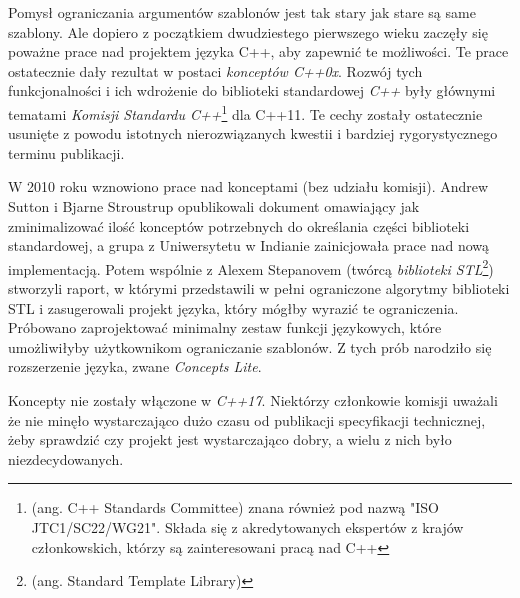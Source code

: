 \documentclass[11pt, a4paper]{article}
\begin{document}
\lstset{language=C++}

Pomysł ograniczania argumentów szablonów jest tak stary jak stare są same szablony. Ale dopiero z początkiem dwudziestego pierwszego wieku zaczęły się poważne prace nad projektem języka C++, aby zapewnić te możliwości. Te prace ostatecznie dały rezultat w postaci \emph{konceptów C++0x}. Rozwój tych funkcjonalności i ich wdrożenie do biblioteki standardowej \emph{C++} były głównymi tematami \emph{Komisji Standardu C++}\footnote{(ang. C++ Standards Committee) znana również pod nazwą "ISO JTC1/SC22/WG21". Składa się z akredytowanych ekspertów z krajów członkowskich, którzy są zainteresowani pracą nad C++} dla C++11. Te cechy zostały ostatecznie usunięte z powodu istotnych nierozwiązanych kwestii i bardziej rygorystycznego terminu publikacji.

W 2010 roku wznowiono prace nad konceptami (bez udziału komisji). Andrew Sutton i Bjarne Stroustrup opublikowali dokument omawiający jak zminimalizować ilość konceptów potrzebnych do określania części biblioteki standardowej, a grupa z Uniwersytetu w Indianie zainicjowała prace nad nową implementacją. Potem wspólnie z Alexem Stepanovem (twórcą \emph{biblioteki STL}\footnote{(ang. Standard Template Library)}) stworzyli raport, w którymi przedstawili w pełni ograniczone algorytmy biblioteki STL i zasugerowali projekt języka, który mógłby wyrazić te ograniczenia. Próbowano zaprojektować minimalny zestaw funkcji językowych, które umożliwiłyby użytkownikom ograniczanie szablonów. Z tych prób narodziło się rozszerzenie języka, zwane \emph{Concepts Lite}.

Koncepty nie zostały włączone w \emph{C++17}. Niektórzy członkowie komisji uważali że nie minęło wystarczająco dużo czasu od publikacji specyfikacji technicznej, żeby sprawdzić czy projekt jest wystarczająco dobry, a wielu z nich było niezdecydowanych.
\end{document}

